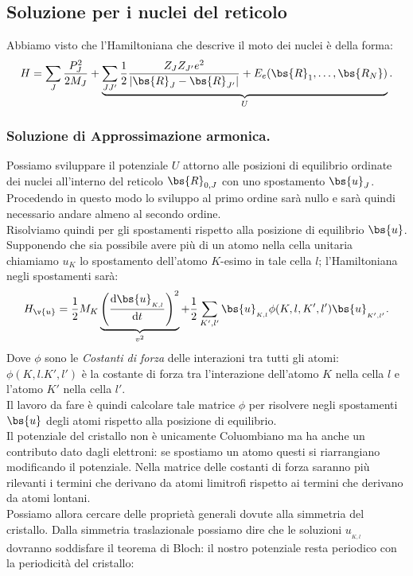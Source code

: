 \subsection{Soluzione per i nuclei del reticolo}
\label{subsec:Soluzione per i nuclei del reticolo}
Abbiamo visto che l'Hamiltoniana che descrive il moto dei nuclei è della forma:
\[
	H 
	=
	\sum_{J}^{} \frac{P_{J}^2}{2M_J} 
	+
	\underbrace{
	\sum_{JJ'}^{} 
	\frac{1}{2}\frac{Z_J Z_{J'}e^2}{\left| \bs{R}_J - \bs{R}_{J'} \right| }
	+
	E_e(\bs{R}_1,\ldots,\bs{R_N})
	}_
	{U}
.\] 
\subsubsection{Soluzione di Approssimazione armonica.}%
Possiamo sviluppare il potenziale $U$ attorno alle posizioni di equilibrio ordinate dei nuclei all'interno del reticolo $\bs{R}_{0,J}$ con uno spostamento $\bs{u}_{J}$. Procedendo in questo modo lo sviluppo al primo ordine sarà nullo e sarà quindi necessario andare almeno al secondo ordine.\\
Risolviamo quindi per gli spostamenti rispetto alla posizione di equilibrio $\bs{u}$.
Supponendo che sia possibile avere più di un atomo nella cella unitaria chiamiamo $u_K$ lo spostamento dell'atomo $K$-esimo in tale cella $l$; l'Hamiltoniana negli spostamenti sarà:
\[
    H_{\v{u}}=
	\frac{1}{2} M_{K}
	\underbrace{
	\left( \frac{\mbox{d} \bs{u}_{_{K,l}}}{\mbox{d} t}  \right)^2
	}_{v^2}
	+
	\frac{1}{2}
	\sum_{K',l'}^{} \bs{u}_{_{K,l}}\phi(K,l,K',l')\bs{u}_{_{K',l'}}
.\] 
Dove $\phi$ sono le \textit{Costanti di forza} delle interazioni tra tutti gli atomi: $\phi(K,l.K',l')$ è la costante di forza tra l'interazione dell'atomo $K$ nella cella $l$ e l'atomo $K'$ nella cella $l'$.\\
Il lavoro da fare è quindi calcolare tale matrice $\phi$ per risolvere negli spostamenti $\bs{u}$ degli atomi rispetto alla posizione di equilibrio. \\
Il potenziale del cristallo non è unicamente Coluombiano ma ha anche un contributo dato dagli elettroni: se spostiamo un atomo questi si riarrangiano modificando il potenziale. 
Nella matrice delle costanti di forza saranno più rilevanti i termini che derivano da atomi limitrofi rispetto ai termini che derivano da atomi lontani.\\
Possiamo allora cercare delle proprietà generali dovute alla simmetria del cristallo. Dalla simmetria traslazionale possiamo dire che le soluzioni $u_{_{K,l}}$ dovranno soddisfare il teorema di Bloch: il nostro potenziale resta periodico con la periodicità del cristallo:
